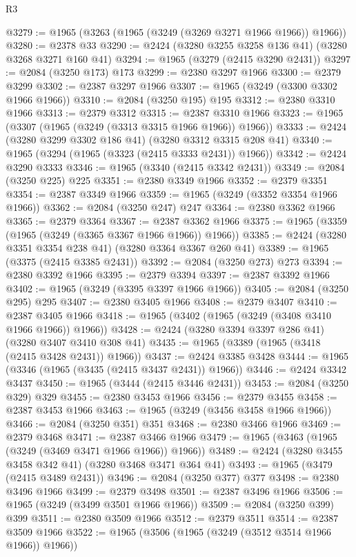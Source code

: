 \begin{lexlean}{R3}
\begin{coremodule}
@3279 := @1965 (@3263 (@1965 (@3249 (@3269 @3271 @1966 @1966)) @1966))
@3280 := @2378 @33
@3290 := @2424 (@3280 @3255 @3258 @136 @41) (@3280 @3268 @3271 @160 @41)
@3294 := @1965 (@3279 (@2415 @3290 @2431))
@3297 := @2084 (@3250 @173) @173
@3299 := @2380 @3297 @1966
@3300 := @2379 @3299
@3302 := @2387 @3297 @1966
@3307 := @1965 (@3249 (@3300 @3302 @1966 @1966))
@3310 := @2084 (@3250 @195) @195
@3312 := @2380 @3310 @1966
@3313 := @2379 @3312
@3315 := @2387 @3310 @1966
@3323 := @1965 (@3307 (@1965 (@3249 (@3313 @3315 @1966 @1966)) @1966))
@3333 := @2424 (@3280 @3299 @3302 @186 @41) (@3280 @3312 @3315 @208 @41)
@3340 := @1965 (@3294 (@1965 (@3323 (@2415 @3333 @2431)) @1966))
@3342 := @2424 @3290 @3333
@3346 := @1965 (@3340 (@2415 @3342 @2431))
@3349 := @2084 (@3250 @225) @225
@3351 := @2380 @3349 @1966
@3352 := @2379 @3351
@3354 := @2387 @3349 @1966
@3359 := @1965 (@3249 (@3352 @3354 @1966 @1966))
@3362 := @2084 (@3250 @247) @247
@3364 := @2380 @3362 @1966
@3365 := @2379 @3364
@3367 := @2387 @3362 @1966
@3375 := @1965 (@3359 (@1965 (@3249 (@3365 @3367 @1966 @1966)) @1966))
@3385 := @2424 (@3280 @3351 @3354 @238 @41) (@3280 @3364 @3367 @260 @41)
@3389 := @1965 (@3375 (@2415 @3385 @2431))
@3392 := @2084 (@3250 @273) @273
@3394 := @2380 @3392 @1966
@3395 := @2379 @3394
@3397 := @2387 @3392 @1966
@3402 := @1965 (@3249 (@3395 @3397 @1966 @1966))
@3405 := @2084 (@3250 @295) @295
@3407 := @2380 @3405 @1966
@3408 := @2379 @3407
@3410 := @2387 @3405 @1966
@3418 := @1965 (@3402 (@1965 (@3249 (@3408 @3410 @1966 @1966)) @1966))
@3428 := @2424 (@3280 @3394 @3397 @286 @41) (@3280 @3407 @3410 @308 @41)
@3435 := @1965 (@3389 (@1965 (@3418 (@2415 @3428 @2431)) @1966))
@3437 := @2424 @3385 @3428
@3444 := @1965 (@3346 (@1965 (@3435 (@2415 @3437 @2431)) @1966))
@3446 := @2424 @3342 @3437
@3450 := @1965 (@3444 (@2415 @3446 @2431))
@3453 := @2084 (@3250 @329) @329
@3455 := @2380 @3453 @1966
@3456 := @2379 @3455
@3458 := @2387 @3453 @1966
@3463 := @1965 (@3249 (@3456 @3458 @1966 @1966))
@3466 := @2084 (@3250 @351) @351
@3468 := @2380 @3466 @1966
@3469 := @2379 @3468
@3471 := @2387 @3466 @1966
@3479 := @1965 (@3463 (@1965 (@3249 (@3469 @3471 @1966 @1966)) @1966))
@3489 := @2424 (@3280 @3455 @3458 @342 @41) (@3280 @3468 @3471 @364 @41)
@3493 := @1965 (@3479 (@2415 @3489 @2431))
@3496 := @2084 (@3250 @377) @377
@3498 := @2380 @3496 @1966
@3499 := @2379 @3498
@3501 := @2387 @3496 @1966
@3506 := @1965 (@3249 (@3499 @3501 @1966 @1966))
@3509 := @2084 (@3250 @399) @399
@3511 := @2380 @3509 @1966
@3512 := @2379 @3511
@3514 := @2387 @3509 @1966
@3522 := @1965 (@3506 (@1965 (@3249 (@3512 @3514 @1966 @1966)) @1966))

\end{coremodule}
\end{lexlean}
